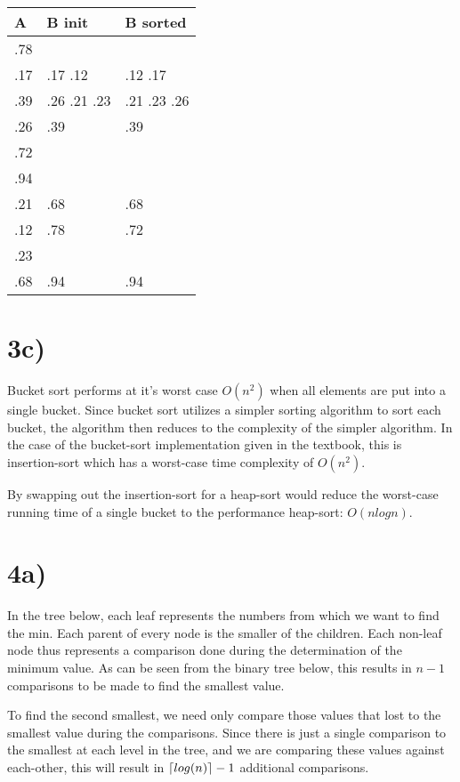 \documentclass[a4paper,11pt]{article}
\DeclarePairedDelimiter{\ceil}{\lceil}{\rceil}
\begin{document}
\begin{center}
  \begin{tabular}{ l | l || l }
    \hline
    A & B init & B sorted \\ \hline \hline
    .78 &  &  \\ \hline
    .17 & .17 .12 & .12 .17 \\ \hline
    .39 & .26 .21 .23 & .21 .23 .26 \\ \hline
    .26 & .39 & .39 \\ \hline
    .72 &  &  \\ \hline
    .94 &  &  \\ \hline
    .21 & .68 & .68 \\ \hline
    .12 & .78 & .72 \\ \hline
    .23 &  &  \\ \hline
    .68 & .94 & .94 \\ \hline
    \hline
  \end{tabular}
\end{center}

\section*{3c)}
Bucket sort performs at it's worst case $O(n^2)$ when
all elements are put into a single bucket.  Since bucket sort
utilizes a simpler sorting algorithm to sort each bucket, 
the algorithm then reduces to the complexity of the simpler
algorithm.  In the case of the bucket-sort implementation
given in the textbook, this is insertion-sort which has a
worst-case time complexity of $O(n^2)$. 

By swapping out the insertion-sort for a heap-sort would 
reduce the worst-case running time of a single bucket to
the performance heap-sort: $O(n log n)$.

\section*{4a)}
In the tree below, each leaf represents the numbers from which we
want to find the min.  Each parent of every node is the smaller of
the children.  Each non-leaf node thus represents a comparison done 
during the determination of the minimum value.  As can be seen from 
the binary tree below, this results in $n-1$ comparisons to be made
to find the smallest value.

To find the second smallest, we need only compare those values that 
lost to the smallest value during the comparisons.  Since there is just
a single comparison to the smallest at each level in the tree, and we 
are comparing these values against each-other, this will 
result in $\ceil{log(n)} -1$ additional comparisons. 
\end{document}
